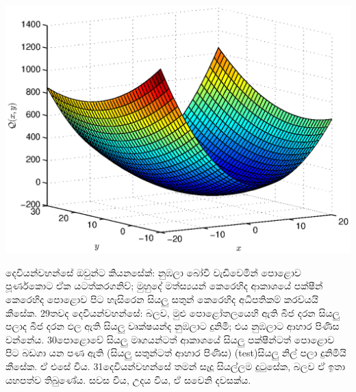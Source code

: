 \documentclass[10pt]{book}
\begin{document}
\begin{center}
\includegraphics[scale=.7]{images/q-plot.eps}
\label{fig:graph}
\end{center}

 දෙවියන්වහන්සේ ඔවුන්ට කියනසේක්: නුඹලා බෝවී වැඩිවෙමින් පොළොව පූර්ණකොට ඒක යටත්කරගනිව්; මුහුදේ මත්ස්‍යයන් කෙරෙහිද ආකාශයේ පක්ෂීන් කෙරෙහිද පොළොව පිට හැසිරෙන සියලු සතුන් කෙරෙහිද අධිපතිකම් කරව්යයි කීසේක. 29තවද දෙවියන්වහන්සේ: බලව, මුළු පොළෝතලයෙහි ඇති බීජ දරන සියලු පලාද බීජ දරන ඵල ඇති සියලු වෘක්ෂයන්ද නුඹලාට දුනිමි; එය නුඹලාට ආහාර පිණිස වන්නේය. 30පොළොවේ සියලු මෘගයන්ටත් ආකාශයේ සියලු පක්ෂීන්ටත් පොළොව පිට බඩගා යන පණ ඇති (සියලු සතුන්ටත් ආහාර පිණිස) (test)සියලු නිල් පලා දුනිමියි කීසේක. ඒ එසේ විය. 31දෙවියන්වහන්සේ තමන් සෑදූ සියල්ලම දුටුසේක, බලව ඒ ඉතා යහපත්ව තිබුණේය. සවස විය, උදය විය, ඒ සවෙනි දවසක්ය. 

 
\end{document}
